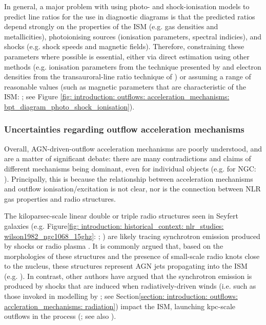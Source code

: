 In general, a major problem with using photo- and shock-ionisation models to predict line ratios for the use in diagnostic diagrams is that the predicted ratios depend strongly on the properties of the ISM (e.g. gas densities and metallicities), photoionising sources (ionisation parameters, spectral indicies), and shocks (e.g. shock speeds and magnetic fields). Therefore, constraining these parameters where possible is essential, either via direct estimation using other methods (e.g. ionisation parameters from the technique presented by \citealt{Baron2019a} and electron densities from the transauroral-line ratio technique of \citealt{Holt2011}) or assuming a range of reasonable values (such as magnetic parameters that are characteristic of the ISM: \citealt{Allen2008}; see Figure \ref{fig: introduction: outflows: acceleration_mechanisms: bpt_diagram_photo_shock_ionisation}).

\subsubsection{Uncertainties regarding outflow acceleration mechanisms}
\label{section: introduction: outflows: accleration_mechanisms: conclusions}

Overall, AGN-driven-outflow acceleration mechanisms are poorly understood, and are a matter of significant debate: there are many contradictions and claims of different mechanisms being dominant, even for individual objects (e.g. for NGC: \citealt{Axon1998, Crenshaw2000_N1068, Das2005, Fischer2017, May2017,  Revalski2021, Meena2023}). Principally, this is because the relationship between acceleration mechanisms and outflow ionisation/excitation is not clear, nor is the connection between NLR gas properties and radio structures.

The kiloparsec-scale linear double or triple radio structures seen in Seyfert galaxies (e.g. Figure\;\ref{fig: introduction: historical_context: nlr_studies: wilson1982_ngc1068_15ghz}: \citealt{Wilson1982}; \citealt{Wilson1980, Pedlar1983, Pedlar1984, Ulvestad1984}) are likely tracing synchrotron emission produced by shocks or radio plasma \citep{Wilson1980, Ulvestad1984}. It is commonly argued that, based on the morphologies of these structures and the presence of small-scale radio knots close to the nucleus, these structures represent AGN jets propagating into the ISM (e.g. \citealt{Wilson1982, Stanghellini2005, Rosario2010b, Riffel2013b, Jarvis2019, Williams2017, Girdhar2022}). In contrast, other authors have argued that the synchrotron emission is produced by shocks that are induced when radiatively-driven winds (i.e. such as those invoked in modelling by \citealt{Hopkins2010}; see Section\;\ref{section: introduction: outflows: accleration_mechanisms: radiation}) impact the ISM, launching kpc-scale outflows in the process (\citealt{Fischer2019}; see also \citealt{Fischer2023}).

